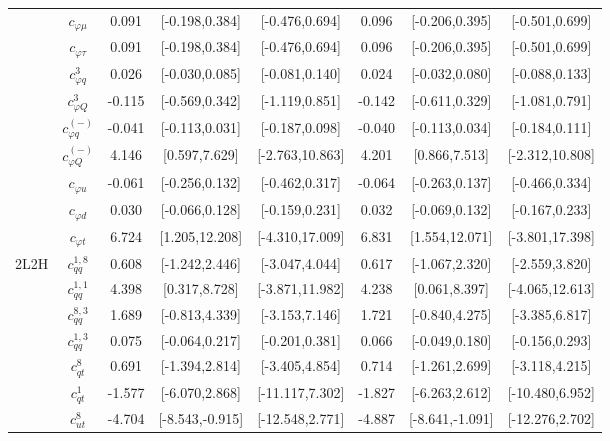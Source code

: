 \documentclass{article}
\begin{document}
\begin{table}[H]
\begin{tabular}{|c|c|c|c|c|c|c|c|}
 & $c_{\varphi \mu}$ & 0.091 & [-0.198,0.384] & [-0.476,0.694]  & 0.096 & [-0.206,0.395] & [-0.501,0.699]  \\ \cline{2-8}
 & $c_{\varphi \tau}$ & 0.091 & [-0.198,0.384] & [-0.476,0.694]  & 0.096 & [-0.206,0.395] & [-0.501,0.699]  \\ \cline{2-8}
 & $c_{\varphi q}^{3}$ & 0.026 & [-0.030,0.085] & [-0.081,0.140]  & 0.024 & [-0.032,0.080] & [-0.088,0.133]  \\ \cline{2-8}
 & $c_{\varphi Q}^{3}$ & -0.115 & [-0.569,0.342] & [-1.119,0.851]  & -0.142 & [-0.611,0.329] & [-1.081,0.791]  \\ \cline{2-8}
 & $c_{\varphi q}^{(-)}$ & -0.041 & [-0.113,0.031] & [-0.187,0.098]  & -0.040 & [-0.113,0.034] & [-0.184,0.111]  \\ \cline{2-8}
 & $c_{\varphi Q}^{(-)}$ & 4.146 & [0.597,7.629] & [-2.763,10.863]  & 4.201 & [0.866,7.513] & [-2.312,10.808]  \\ \cline{2-8}
 & $c_{\varphi u}$ & -0.061 & [-0.256,0.132] & [-0.462,0.317]  & -0.064 & [-0.263,0.137] & [-0.466,0.334]  \\ \cline{2-8}
 & $c_{\varphi d}$ & 0.030 & [-0.066,0.128] & [-0.159,0.231]  & 0.032 & [-0.069,0.132] & [-0.167,0.233]  \\ \cline{2-8}
 & $c_{\varphi t}$ & 6.724 & [1.205,12.208] & [-4.310,17.009]  & 6.831 & [1.554,12.071] & [-3.801,17.398]  \\ \cline{2-8}
\hline
\multirow{14}{*}{2L2H}
 & $c_{qq}^{1,8}$ & 0.608 & [-1.242,2.446] & [-3.047,4.044]  & 0.617 & [-1.067,2.320] & [-2.559,3.820]  \\ \cline{2-8}
 & $c_{qq}^{1,1}$ & 4.398 & [0.317,8.728] & [-3.871,11.982]  & 4.238 & [0.061,8.397] & [-4.065,12.613]  \\ \cline{2-8}
 & $c_{qq}^{8,3}$ & 1.689 & [-0.813,4.339] & [-3.153,7.146]  & 1.721 & [-0.840,4.275] & [-3.385,6.817]  \\ \cline{2-8}
 & $c_{qq}^{1,3}$ & 0.075 & [-0.064,0.217] & [-0.201,0.381]  & 0.066 & [-0.049,0.180] & [-0.156,0.293]  \\ \cline{2-8}
 & $c_{qt}^{8}$ & 0.691 & [-1.394,2.814] & [-3.405,4.854]  & 0.714 & [-1.261,2.699] & [-3.118,4.215]  \\ \cline{2-8}
 & $c_{qt}^{1}$ & -1.577 & [-6.070,2.868] & [-11.117,7.302]  & -1.827 & [-6.263,2.612] & [-10.480,6.952]  \\ \cline{2-8}
 & $c_{ut}^{8}$ & -4.704 & [-8.543,-0.915] & [-12.548,2.771]  & -4.887 & [-8.641,-1.091] & [-12.276,2.702]  \\ \cline{2-8}

\end{tabular}
\end{table}
\end{document}
